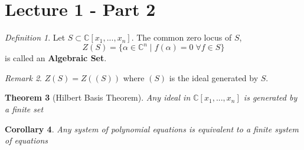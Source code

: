 \documentclass[12pt]{article}
\newtheorem{theorem}{Theorem}[section]
\newtheorem{corollary}[theorem]{Corollary}
\theoremstyle{remark}
\newtheorem{remark}[theorem]{Remark}
\newtheorem{definition}[theorem]{Definition}
\newcommand{\C}{\mathbb{C}}
\begin{document}
\section{Lecture 1 - Part 2}

\begin{definition}
Let $S \subset \C[x_1,...,x_n]$. The common zero locus of $S$,
$$Z(S) = \{ \alpha \in \C^n \; | \; f(\alpha) = 0 \; \forall f \in S \} $$
is called an \textbf{Algebraic Set}.
\end{definition}

\begin{remark}
$Z(S) = Z((S))$ where $(S)$ is the ideal generated by $S$.
\end{remark}

\begin{theorem}[Hilbert Basis Theorem]
Any ideal in $\C[x_1,...,x_n]$ is generated by a finite set
\end{theorem}

\begin{corollary}
Any system of polynomial equations is equivalent to a finite system of equations
\end{corollary}
\end{document}
